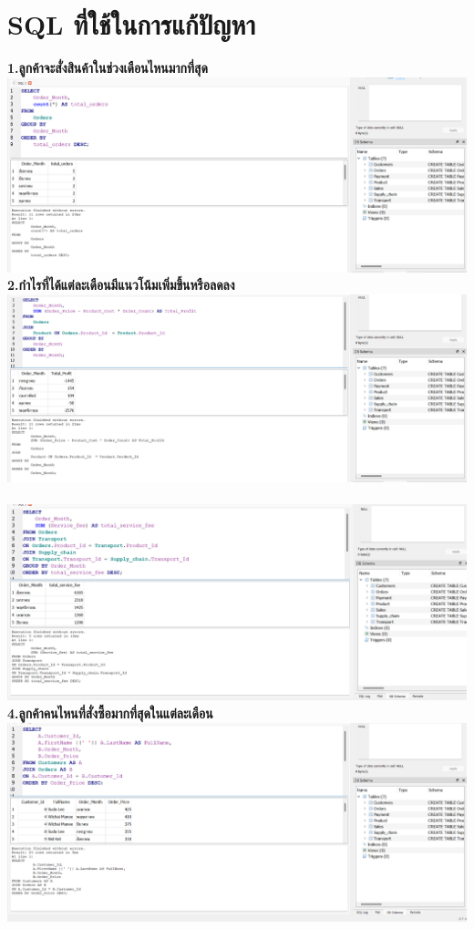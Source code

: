 \documentclass{report}
\begin{document}
\section{SQL ที่ใช้ในการแก้ปัญหา}
\textbf{1.ลูกค้าจะสั่งสินค้าในช่วงเดือนไหนมากที่สุด}\\
\includegraphics[width=\textwidth]{pb1.jpg}\\
\textbf{2.กำไรที่ได้แต่ละเดือนมีแนวโน้มเพิ่มขึ้นหรือลดลง}\\
\includegraphics[width=\textwidth]{pb2.jpg}\\
\\
\includegraphics[width=\textwidth]{pb3.jpg}\\
\textbf{4.ลูกค้าคนไหนที่สั่งซื้อมากที่สุดในแต่ละเดือน}\\
\includegraphics[width=\textwidth]{pb4.jpg}\\
\end{document}
